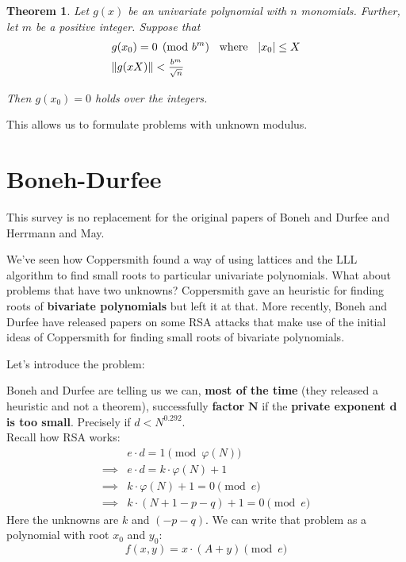 \documentclass[a4paper,11pt]{article}
\newtheorem{theorem}{Theorem}
\begin{document}
\begin{theorem}
Let $g(x)$ be an univariate polynomial with $n$ monomials. Further, let $m$ be a positive integer. Suppose that
\setcounter{equation}{0}
\begin{align}
&g(x_0) = 0 \pmod{b^m} \hspace{2mm} \text{ where } \hspace{2mm} |x_0| \leq X\\
&\|g(xX)\| < \frac{_{b^m}}{^{\sqrt{n}}}
\end{align}

Then $g(x_0)=0$ holds over the integers.
\end{theorem}

This allows us to formulate problems with unknown modulus.

\section{Boneh-Durfee}\label{bonehdurfee}

This survey is no replacement for the original papers of Boneh and Durfee\cite{bonehdurfee} and Herrmann and May\cite{herrmannmay}.

We've seen how Coppersmith found a way of using lattices and the LLL algorithm to find small roots to particular univariate polynomials. What about problems that have two unknowns? Coppersmith gave an heuristic for finding roots of \textbf{bivariate polynomials} but left it at that. More recently, Boneh and Durfee have released papers on some RSA attacks that make use of the initial ideas of Coppersmith for finding small roots of bivariate polynomials.

Let's introduce the problem:

Boneh and Durfee are telling us we can, \textbf{most of the time} (they released a heuristic and not a theorem), successfully \textbf{factor} $\textbf{N}$ if the \textbf{private exponent $\textbf{d}$ is too small}. Precisely if $d < N^{0.292}$.\\

Recall how RSA works:
\begin{align*}
&e \cdot d = 1 \pmod{\varphi(N)}\\
\implies& e \cdot d = k \cdot \varphi(N) + 1\\
\implies& k \cdot \varphi(N) + 1 = 0 \pmod{e}\\
\implies& k \cdot (N + 1 - p - q) + 1 = 0 \pmod{e}
\end{align*}
Here the unknowns are $k$ and $(-p-q)$. We can write that problem as a polynomial with root $x_0$ and $y_0$:
\[ f(x,y) = x \cdot (A + y) \pmod{e} \]
\end{document}

